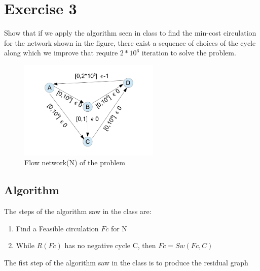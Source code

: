 \documentclass[]{article}
\begin{document}
\section{Exercise 3}

Show that if we apply the algorithm seen in class to find the min-cost circulation for the network shown
in the figure, there exist a sequence of choices of the cycle along which we improve that require $2*10^6$
iteration to solve the problem.



\begin{figure}[H]
	\begin{center}
		\includegraphics[width=0.6\textwidth]{abcd.png}
		\caption{Flow network(N) of the problem }
		
	\end{center}
\end{figure}


\subsection{Algorithm}

The steps of the algorithm saw in the class are:
\begin{enumerate}

\item Find a Feasible circulation $Fc$ for N 
\item While $R(Fc)$ has no negative cycle C, then $Fc = Sw(Fc,C)$

\end{enumerate}



The fist step of the algorithm saw in the class is to produce the residual graph 
\end{document}

